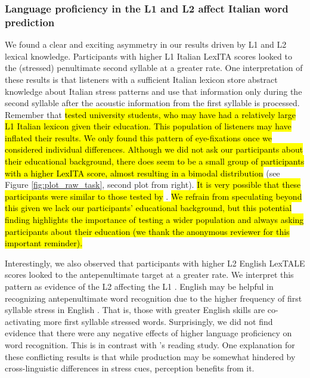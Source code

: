 \subsubsection{Language proficiency in the L1 and L2 affect Italian word prediction}

We found a clear and exciting asymmetry in our results driven by L1 and L2 lexical knowledge. Participants with higher L1 Italian LexITA scores looked to the (stressed) penultimate second syllable at a greater rate. One interpretation of these results is that listeners with a sufficient Italian lexicon store abstract knowledge about Italian stress patterns and use that information only during the second syllable after the acoustic information from the first syllable is processed. Remember that \cite{Sulpizio_McQueen_2012} \hl{tested university students, who may have had a relatively large L1 Italian lexicon given their education. This population of listeners may have inflated their results. We only found this pattern of eye-fixations once we considered individual differences. Although we did not ask our participants about their educational background, there does seem to be a small group of participants with a higher LexITA score, almost resulting in a bimodal distribution} (see Figure \ref{fig:plot_raw_task}, second plot from right). \hl{It is very possible that these participants were similar to those tested by} \cite{Sulpizio_McQueen_2012}. \hl{We refrain from speculating beyond this given we lack our participants' educational background, but this potential finding highlights the importance of testing a wider population and always asking participants about their education (we thank the anonymous reviewer for this important reminder).}

Interestingly, we also observed that participants with higher L2 English LexTALE scores looked to the antepenultimate target at a greater rate. We interpret this pattern as evidence of the L2 affecting the L1 \citep{marian2003competing, dijkstra2002architecture}. English may be helpful in recognizing antepenultimate word recognition due to the higher frequency of first syllable stress in English \cite{cutler2007dutch}. That is, those with greater English skills are co-activating more first syllable stressed words. Surprisingly, we did not find evidence that there were any negative effects of higher language proficiency on word recognition. This is in contrast with \cite{primativo2013bilingual}'s reading study. One explanation for these conflicting results is that while production may be somewhat hindered by cross-linguistic differences in stress cues, perception benefits from it.

